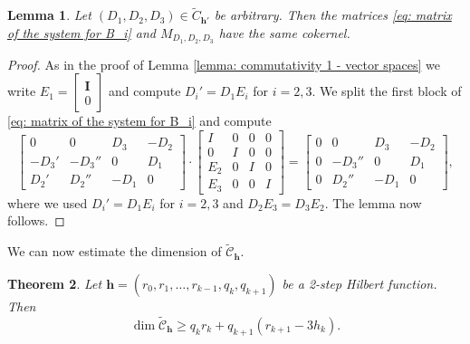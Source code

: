 \documentclass[11pt]{amsart}
\newtheorem{thm}{Theorem}[section]
\newtheorem{lemma}[thm]{Lemma}
\theoremstyle{definition}
\newcommand{\h}{\mathbf{h}}
\newcommand{\tC}{\widetilde{C}}
\newcommand{\tcC}{\widetilde{\mathscr{C}}}
\newcommand{\II}{\mathbf{I}}
\begin{document}
\begin{lemma}\label{lemma: smaller matrix}
Let $(D_1,D_2,D_3)\in \tC_{\h'}$ be arbitrary. Then the matrices \eqref{eq: matrix of the system for B_i} and $M_{D_1,D_2,D_3}$ have the same cokernel.
\end{lemma}

\begin{proof}
As in the proof of Lemma \ref{lemma: commutativity 1 - vector spaces} we write $E_1=\begin{bmatrix}\II \\ 0 \end{bmatrix}$ and compute $D_i'=D_1E_i$ for $i=2,3$. We split the first block of \eqref{eq: matrix of the system for B_i} and compute
$$\begin{bmatrix}
0 & 0 & D_3 & -D_2\\
-D_3' & -D_3'' & 0 & D_1\\
D_2' & D_2'' & -D_1 & 0
\end{bmatrix}\cdot \begin{bmatrix} 
I & 0 & 0 & 0\\
0 & I & 0 & 0\\
E_2 & 0 & I & 0\\
E_3 & 0 & 0 & I
\end{bmatrix}=\begin{bmatrix}
0 & 0 & D_3 & -D_2\\
0 & -D_3'' & 0 & D_1\\
0 & D_2'' & -D_1 & 0
\end{bmatrix},$$
where we used $D_i'=D_1E_i$ for $i=2,3$ and $D_2E_3=D_3E_2$. The lemma now follows.
\end{proof}

We can now estimate the dimension of $\tcC_\h$.

\begin{thm}\label{thm: dim homogeneous C_h}
Let $\h=(r_0,r_1,\ldots ,r_{k-1},q_k,q_{k+1})$ be a 2-step Hilbert function. Then
$$\dim \tcC_\h\ge q_kr_k+q_{k+1}(r_{k+1}-3h_k).$$
\end{thm}
\end{document}
